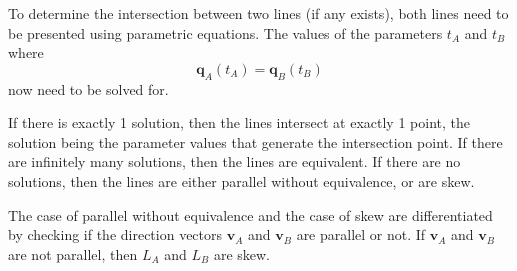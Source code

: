 \documentclass{article}
\begin{document}
To determine the intersection between two lines (if any exists), both lines need to be presented using parametric equations. The values of the parameters \(t_A\) and \(t_B\) where 
\[\mathbf{q}_A(t_A) = \mathbf{q}_B(t_B)\]
now need to be solved for. 

If there is exactly 1 solution, then the lines intersect at exactly 1 point, the solution being the parameter values that generate the intersection point. If there are infinitely many solutions, then the lines are equivalent. If there are no solutions, then the lines are either parallel without equivalence, or are skew. 

The case of parallel without equivalence and the case of skew are differentiated by checking if the direction vectors \(\mathbf{v}_A\) and \(\mathbf{v}_B\) are parallel or not. If \(\mathbf{v}_A\) and \(\mathbf{v}_B\) are not parallel, then \(L_A\) and \(L_B\) are skew.
\end{document}
